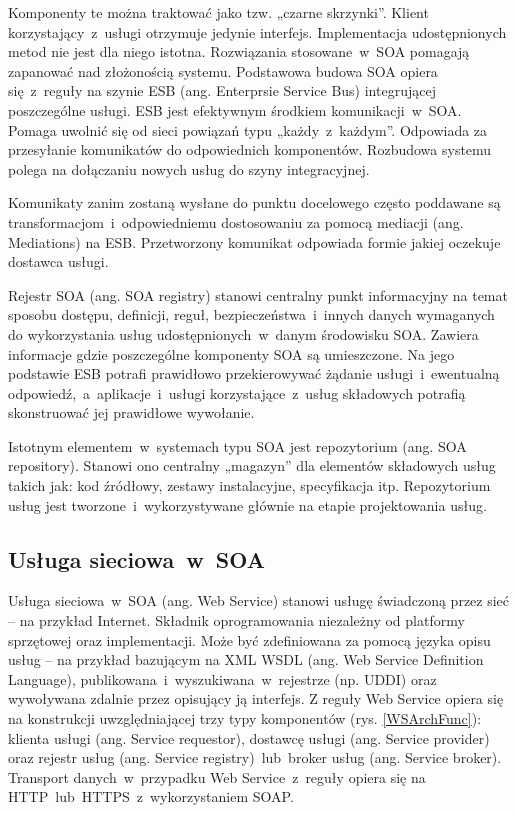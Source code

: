 Komponenty te można traktować jako tzw. „czarne skrzynki”. Klient korzystający~z~usługi otrzymuje jedynie interfejs. Implementacja udostępnionych metod nie jest dla niego istotna.
Rozwiązania stosowane~w~SOA pomagają zapanować nad złożonością systemu. Podstawowa budowa SOA opiera się~z~reguły na szynie ESB (ang. Enterprsie Service Bus) integrującej poszczególne usługi. ESB jest efektywnym środkiem komunikacji~w~SOA. Pomaga uwolnić się od sieci powiązań typu „każdy~z~każdym”. Odpowiada za przesyłanie komunikatów do odpowiednich komponentów. Rozbudowa systemu polega na dołączaniu nowych usług do szyny integracyjnej. 
	
Komunikaty zanim zostaną wysłane do punktu docelowego często poddawane są transformacjom~i~odpowiedniemu dostosowaniu za pomocą mediacji (ang. Mediations) na ESB. Przetworzony komunikat odpowiada formie jakiej oczekuje dostawca usługi.
	
Rejestr SOA (ang. SOA registry) stanowi centralny punkt informacyjny na temat sposobu dostępu, definicji, reguł, bezpieczeństwa~i~innych danych wymaganych do wykorzystania usług udostępnionych~w~danym środowisku SOA. Zawiera informacje gdzie poszczególne komponenty SOA są umieszczone. Na jego podstawie ESB potrafi prawidłowo przekierowywać żądanie usługi~i~ewentualną odpowiedź,~a~aplikacje~i~usługi korzystające~z~usług składowych potrafią skonstruować jej prawidłowe wywołanie.
	
Istotnym elementem~w~systemach typu SOA jest repozytorium (ang. SOA repository). Stanowi ono centralny „magazyn” dla elementów składowych usług takich jak: kod źródłowy, zestawy instalacyjne, specyfikacja itp. Repozytorium usług jest tworzone~i~wykorzystywane głównie na etapie projektowania usług.

\subsection{Usługa sieciowa~w~SOA}
Usługa sieciowa~w~SOA (ang. Web Service) stanowi usługę świadczoną przez sieć – na przykład Internet. Składnik oprogramowania niezależny od platformy sprzętowej oraz implementacji. Może być zdefiniowana za pomocą języka opisu usług – na przykład bazującym na XML WSDL (ang. Web Service Definition Language), publikowana~i~wyszukiwana~w~rejestrze (np. UDDI) oraz wywoływana zdalnie przez opisujący ją interfejs. 
Z reguły Web Service opiera się na konstrukcji uwzględniającej trzy typy komponentów (rys. \ref{WSArchFunc}): klienta usługi (ang. Service requestor), dostawcę usługi (ang. Service provider) oraz rejestr usług (ang. Service registry)~lub~broker usług (ang. Service broker).  Transport danych~w~przypadku Web Service~z~reguły opiera się na HTTP~lub~HTTPS~z~wykorzystaniem SOAP.

